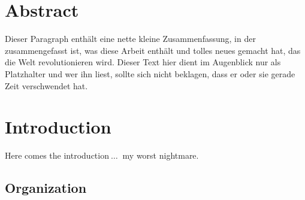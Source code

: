 \section*{Abstract}

Dieser Paragraph enthält eine nette kleine Zusammenfassung, in der zusammengefasst ist, was diese Arbeit enthält und tolles neues gemacht hat, das die Welt revolutionieren wird. Dieser Text hier dient im Augenblick nur als Platzhalter und wer ihn liest, sollte sich nicht beklagen, dass er oder sie gerade Zeit verschwendet hat.
\newpage

\section{Introduction}
Here comes the introduction$\ \ldots\ $ my worst nightmare.\newpage

%

\subsection{Organization}
